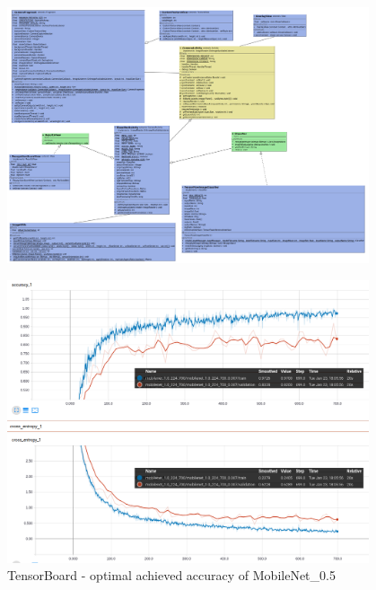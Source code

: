 \begin{figure}
\includegraphics[width=0.95\textwidth]{includes/ClassDiagram}
\end{figure}
\newpage




\begin{figure}[htbp]
\centering
\includegraphics[width=0.95\textwidth]{includes/MobileNet05-700res}
\caption{TensorBoard - optimal achieved accuracy of MobileNet_0.5}
\label{fig:MobileNet05-700res}
\end{figure}

